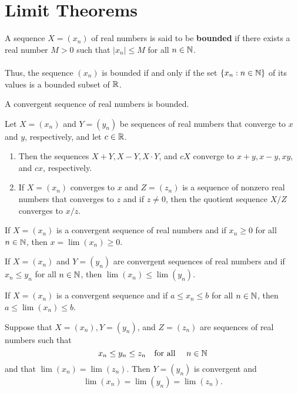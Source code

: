 \section{Limit Theorems}

\begin{definition}
	A sequence $X=(x_n)$ of real numbers is said to be \textbf{bounded} if there exists a real number $M>0$ such that $|x_n|\leq M$ for all $n \in \mathbb{N}$.
	\\\\Thus, the sequence $(x_n)$ is bounded if and only if the set $\{x_n : n \in \mathbb{N}\}$ of its values is a bounded subset of $\mathbb{R}$.
\end{definition}

\begin{theorem}
	A convergent sequence of real numbers is bounded.
\end{theorem}

\begin{theorem}
	Let $X=(x_n)$ and $Y=(y_n)$ be sequences of real numbers that converge to $x$ and $y$, respectively, and let $c \in \mathbb{R}$.
	\begin{enumerate}
		\item Then the sequences $X+Y, X-Y, X \cdot Y$, and $cX$ converge to $x+y, x-y, xy$, and $cx$, respectively.

		\item If $X=(x_n)$ converges to $x$ and $Z=(z_n)$ is a sequence of nonzero real numbers that converges to $z$ and if $z \neq 0$, then the quotient sequence $X/Z$ converges to $x/z$.
	\end{enumerate}
\end{theorem}

\begin{theorem}
	If $X=(x_n)$ is a convergent sequence of real numbers and if $x_n \geq 0$ for all $n \in \mathbb{N}$, then $x = \lim (x_n) \geq 0$.
\end{theorem}

\begin{theorem}
	If $X=(x_n)$ and $Y=(y_n)$ are convergent sequences of real numbers and if $x_n \leq y_n$ for all $n \in \mathbb{N}$, then $\lim (x_n) \leq \lim (y_n)$.
\end{theorem}

\begin{theorem}
	If $X=(x_n)$ is a convergent sequence and if $a \leq x_n \leq b$ for all $n \in \mathbb{N}$, then $a \leq \lim (x_n) \leq b$.
\end{theorem}

\begin{theorem}
	Suppose that $X=(x_n), Y= (y_n)$, and $Z=(z_n)$ are sequences of real numbers such that
	\[x_n \leq y_n \leq z_n\ \ \ \text{for all }\ \ \ n \in \mathbb{N}\]
	and that $\lim (x_n) = \lim (z_n)$. Then $Y=(y_n)$ is convergent and
	\[\lim (x_n) = \lim (y_n) = \lim (z_n).\]
\end{theorem}

